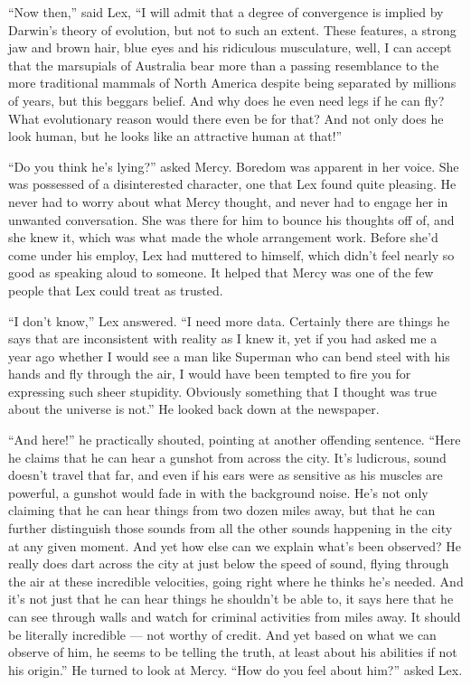 ``Now then,'' said Lex, ``I will admit that a degree of convergence is
implied by Darwin's theory of evolution, but not to such an extent.
These features, a strong jaw and brown hair, blue eyes and his
ridiculous musculature, well, I can accept that the marsupials of
Australia bear more than a passing resemblance to the more traditional
mammals of North America despite being separated by millions of years,
but this beggars belief. And why does he even need legs if he can fly?
What evolutionary reason would there even be for that? And not only does
he look human, but he looks like an attractive human at that!''

``Do you think he's lying?'' asked Mercy. Boredom was apparent in her
voice. She was possessed of a disinterested character, one that Lex
found quite pleasing. He never had to worry about what Mercy thought,
and never had to engage her in unwanted conversation. She was there for
him to bounce his thoughts off of, and she knew it, which was what made
the whole arrangement work. Before she'd come under his employ, Lex had
muttered to himself, which didn't feel nearly so good as speaking aloud
to someone. It helped that Mercy was one of the few people that Lex
could treat as trusted.

``I don't know,'' Lex answered. ``I need more data. Certainly there are
things he says that are inconsistent with reality as I knew it, yet if
you had asked me a year ago whether I would see a man like Superman who
can bend steel with his hands and fly through the air, I would have been
tempted to fire you for expressing such sheer stupidity. Obviously
something that I thought was true about the universe is not.'' He looked
back down at the newspaper.

``And here!'' he practically shouted, pointing at another offending
sentence. ``Here he claims that he can hear a gunshot from across the
city. It's ludicrous, sound doesn't travel that far, and even if his
ears were as sensitive as his muscles are powerful, a gunshot would fade
in with the background noise. He's not only claiming that he can hear
things from two dozen miles away, but that he can further distinguish
those sounds from all the other sounds happening in the city at any
given moment. And yet how else can we explain what's been observed? He
really does dart across the city at just below the speed of sound,
flying through the air at these incredible velocities, going right where
he thinks he's needed. And it's not just that he can hear things he
shouldn't be able to, it says here that he can see through walls and
watch for criminal activities from miles away. It should be literally
incredible --- not worthy of credit. And yet based on what we can
observe of him, he seems to be telling the truth, at least about his
abilities if not his origin.'' He turned to look at Mercy. ``How do you
feel about him?'' asked Lex.

